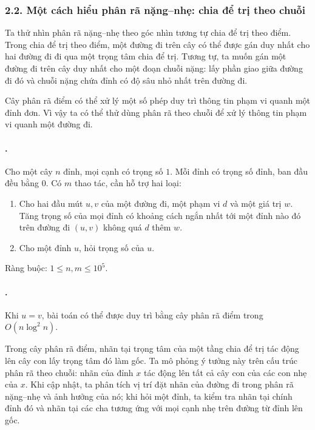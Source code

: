 \documentclass[11pt]{article}
\begin{document}
\subsubsection*{2.2. Một cách hiểu phân rã nặng--nhẹ: chia để trị theo chuỗi}

Ta thử nhìn phân rã nặng--nhẹ theo góc nhìn tương tự chia để trị theo điểm.
Trong chia để trị theo điểm, một đường đi trên cây có thể được gán duy nhất
cho hai đường đi đi qua một trọng tâm chia để trị. Tương tự, ta muốn gán một
đường đi trên cây duy nhất cho một đoạn chuỗi nặng: lấy phần giao giữa đường
đi đó và chuỗi nặng chứa đỉnh có độ sâu nhỏ nhất trên đường đi.

Cây phân rã điểm có thể xử lý một số phép duy trì thông tin phạm vi quanh một
đỉnh đơn. Vì vậy ta có thể thử dùng phân rã theo chuỗi để xử lý thông tin phạm
vi quanh một đường đi.

\paragraph{.}
Cho một cây \(n\) đỉnh, mọi cạnh có trọng số \(1\). Mỗi đỉnh có trọng số đỉnh,
ban đầu đều bằng \(0\). Có \(m\) thao tác, cần hỗ trợ hai loại:
\begin{enumerate}
  \item Cho hai đầu mút \(u,v\) của một đường đi, một phạm vi \(d\) và một giá
  trị \(w\). Tăng trọng số của mọi đỉnh có khoảng cách ngắn nhất tới một đỉnh
  nào đó trên đường đi \((u,v)\) không quá \(d\) thêm \(w\).
  \item Cho một đỉnh \(u\), hỏi trọng số của \(u\).
\end{enumerate}
Ràng buộc: \(1\le n,m\le 10^5\).

\paragraph{.}
Khi \(u=v\), bài toán có thể được duy trì bằng cây phân rã điểm trong
\(O(n\log^2 n)\).

Trong cây phân rã điểm, nhãn tại trọng tâm của một tầng chia để trị tác động
lên cây con lấy trọng tâm đó làm gốc. Ta mô phỏng ý tưởng này trên cấu trúc
phân rã theo chuỗi: nhãn của đỉnh \(x\) tác động lên tất cả cây con của các
con nhẹ của \(x\). Khi cập nhật, ta phân tích vị trí đặt nhãn của đường đi
trong phân rã nặng--nhẹ và ảnh hưởng của nó; khi hỏi một đỉnh, ta kiểm tra
nhãn tại chính đỉnh đó và nhãn tại các cha tương ứng với mọi cạnh nhẹ trên
đường từ đỉnh lên gốc.
\end{document}
